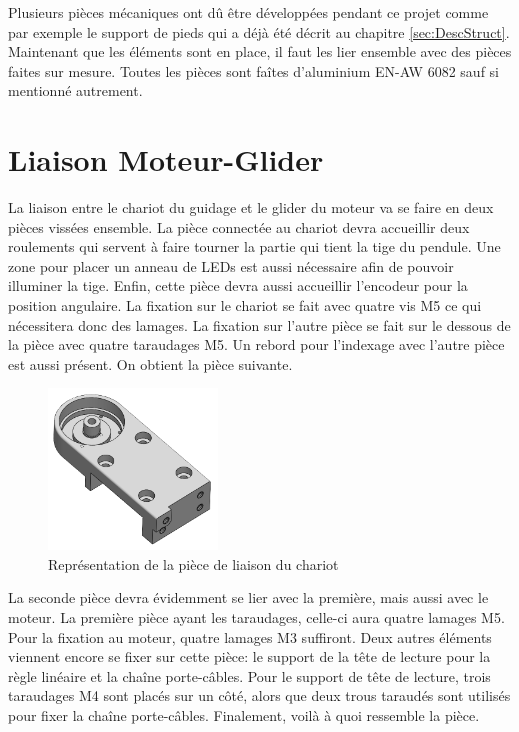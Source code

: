 Plusieurs pièces mécaniques ont dû être développées pendant ce projet comme par exemple le support de pieds  qui a déjà été décrit au chapitre \ref{sec:DescStruct}.
Maintenant que les éléments sont en place, il faut les lier ensemble avec des pièces faites sur mesure. Toutes les pièces sont faîtes
d'aluminium EN-AW 6082 sauf si mentionné autrement.

\section{Liaison Moteur-Glider}\label{sec:LiaisonMotGlid}
La liaison entre le chariot du guidage et le \gls{glider} du moteur va se faire en deux pièces vissées ensemble. La pièce
connectée au chariot devra accueillir deux roulements qui servent à faire tourner la partie qui tient la tige du pendule. Une zone pour placer
un anneau de LEDs est aussi nécessaire afin de pouvoir illuminer la tige. Enfin, cette pièce devra aussi accueillir l'encodeur pour la position
angulaire. La fixation sur le chariot se fait avec quatre vis M5 ce qui nécessitera donc des lamages. La fixation sur l'autre pièce se fait sur
le dessous de la pièce avec quatre taraudages M5. Un rebord pour l'indexage avec l'autre pièce est aussi présent. On obtient la pièce suivante.

\begin{figure}[H]
  \centering
  \includegraphics[width = 0.4\textwidth]{assets/figures/LiaisonChariot.png}
  \caption{Représentation de la pièce de liaison du chariot}
  \label{fig:LiaisonChariot}
\end{figure}

La seconde pièce devra évidemment se lier avec la première, mais aussi avec le moteur. La première pièce ayant les taraudages, celle-ci aura quatre
lamages M5. Pour la fixation au moteur, quatre lamages M3 suffiront. Deux autres éléments viennent encore se fixer sur cette pièce: le support de
la tête de lecture pour la règle linéaire et la chaîne porte-câbles. Pour le support de tête de lecture, trois taraudages M4 sont placés sur un côté,
alors que deux trous taraudés sont utilisés pour fixer la chaîne porte-câbles. Finalement, voilà à quoi ressemble la pièce.

